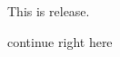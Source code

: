 
\cfoot[{\miniMark\hfill}]
{\fancyplain{\hfill\thepage\hfill\makebox[0pt][r]{\kern1cm\miniMark}}{\hfill\miniMark}}
\pagestyle{fancyplain}

This is release.

continue right here

%
